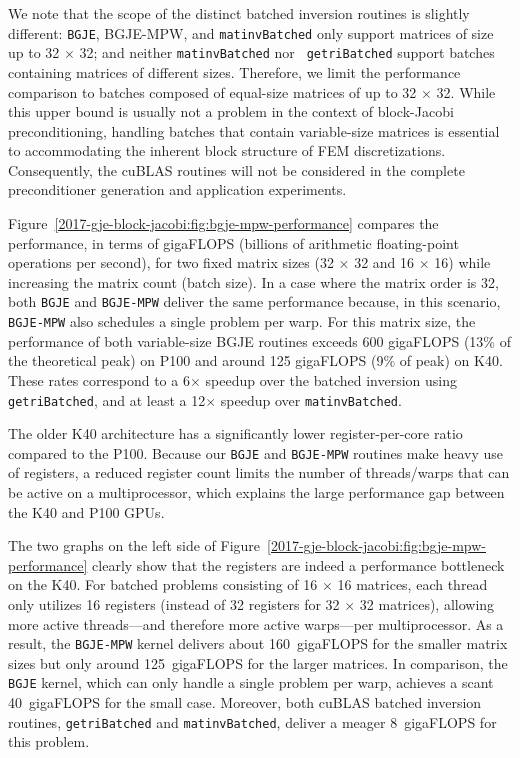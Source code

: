 We note that the scope of the distinct batched inversion routines is slightly
different: {\tt BGJE}, {\sc BGJE-MPW}, and {\tt matinvBatched} only support
matrices of size up to 32 $\times$ 32; and neither {\tt matinvBatched} nor {\tt
	getriBatched} support batches containing matrices of different sizes. Therefore,
we limit the performance comparison to batches composed of equal-size matrices
of up to 32 $\times$ 32. While this upper bound is usually not a problem in the
context of block-Jacobi preconditioning, handling batches that contain variable-size 
matrices is essential to accommodating the inherent block structure of FEM
discretizations. Consequently, the cuBLAS routines will not be considered
in the complete preconditioner generation and application experiments.

Figure~\ref{2017-gje-block-jacobi:fig:bgje-mpw-performance} compares the performance, in terms of
gigaFLOPS (billions of arithmetic floating-point operations per second), for two 
fixed matrix sizes (32 $\times$ 32 and 16 $\times$ 16) while increasing the matrix count (batch size).
In a case where the matrix order is 32, both {\tt BGJE} and {\tt BGJE-MPW} deliver the
same performance because, in this scenario, {\tt BGJE-MPW} also schedules a single
problem per warp. For this matrix size, the performance of both variable-size
BGJE routines exceeds 600 gigaFLOPS {(13\% of the theoretical peak)} on P100 and
around 125 gigaFLOPS {(9\% of peak)} on K40. These rates correspond to a 6$\times$
speedup over the batched inversion using {\tt getriBatched}, and at least a
12$\times$ speedup over {\tt matinvBatched}.

The older K40 architecture has a significantly lower register-per-core ratio
compared to the P100. Because our {\tt BGJE} and {\tt BGJE-MPW} routines make heavy
use of registers, a reduced register count limits the number of threads/warps
that can be active on a multiprocessor, which explains the large performance gap
between the K40 and P100 GPUs.

The two graphs on the left side of Figure~\ref{2017-gje-block-jacobi:fig:bgje-mpw-performance} clearly show 
that the registers are indeed a performance bottleneck on the K40. 
For batched problems consisting of 16 $\times$ 16 matrices, each thread only utilizes 
16 registers (instead of 32 registers for 32 $\times$ 32 matrices), allowing more active 
threads---and therefore more active warps---per
multiprocessor. As a result, the {\tt BGJE-MPW} kernel delivers about 160~gigaFLOPS
for the smaller matrix sizes but only around 125~gigaFLOPS for the larger matrices. In
comparison, the {\tt BGJE} kernel, which can only handle a single problem per
warp, achieves a scant 40~gigaFLOPS for the small case. Moreover, both cuBLAS
batched inversion routines, {\tt getriBatched} and {\tt matinvBatched}, deliver
a meager 8~gigaFLOPS for this problem.

